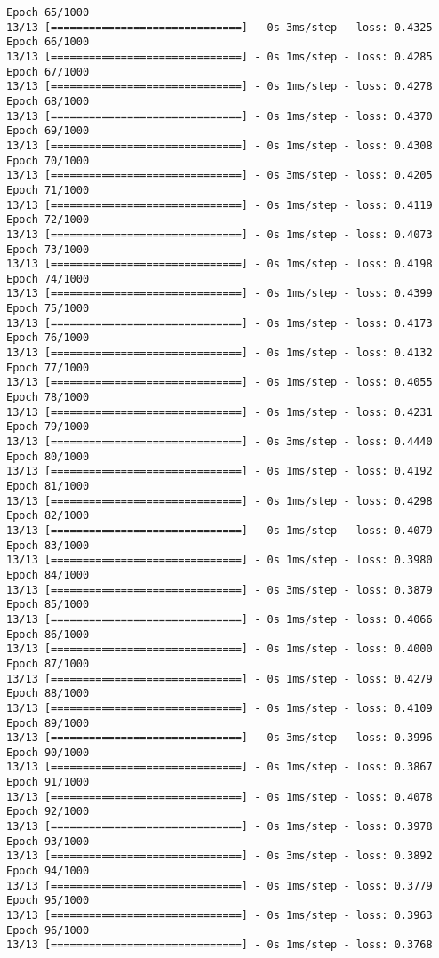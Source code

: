 \documentclass[11pt]{article}
\begin{document}
\begin{Verbatim}[commandchars=\\\{\}]
Epoch 65/1000
13/13 [==============================] - 0s 3ms/step - loss: 0.4325
Epoch 66/1000
13/13 [==============================] - 0s 1ms/step - loss: 0.4285
Epoch 67/1000
13/13 [==============================] - 0s 1ms/step - loss: 0.4278
Epoch 68/1000
13/13 [==============================] - 0s 1ms/step - loss: 0.4370
Epoch 69/1000
13/13 [==============================] - 0s 1ms/step - loss: 0.4308
Epoch 70/1000
13/13 [==============================] - 0s 3ms/step - loss: 0.4205
Epoch 71/1000
13/13 [==============================] - 0s 1ms/step - loss: 0.4119
Epoch 72/1000
13/13 [==============================] - 0s 1ms/step - loss: 0.4073
Epoch 73/1000
13/13 [==============================] - 0s 1ms/step - loss: 0.4198
Epoch 74/1000
13/13 [==============================] - 0s 1ms/step - loss: 0.4399
Epoch 75/1000
13/13 [==============================] - 0s 1ms/step - loss: 0.4173
Epoch 76/1000
13/13 [==============================] - 0s 1ms/step - loss: 0.4132
Epoch 77/1000
13/13 [==============================] - 0s 1ms/step - loss: 0.4055
Epoch 78/1000
13/13 [==============================] - 0s 1ms/step - loss: 0.4231
Epoch 79/1000
13/13 [==============================] - 0s 3ms/step - loss: 0.4440
Epoch 80/1000
13/13 [==============================] - 0s 1ms/step - loss: 0.4192
Epoch 81/1000
13/13 [==============================] - 0s 1ms/step - loss: 0.4298
Epoch 82/1000
13/13 [==============================] - 0s 1ms/step - loss: 0.4079
Epoch 83/1000
13/13 [==============================] - 0s 1ms/step - loss: 0.3980
Epoch 84/1000
13/13 [==============================] - 0s 3ms/step - loss: 0.3879
Epoch 85/1000
13/13 [==============================] - 0s 1ms/step - loss: 0.4066
Epoch 86/1000
13/13 [==============================] - 0s 1ms/step - loss: 0.4000
Epoch 87/1000
13/13 [==============================] - 0s 1ms/step - loss: 0.4279
Epoch 88/1000
13/13 [==============================] - 0s 1ms/step - loss: 0.4109
Epoch 89/1000
13/13 [==============================] - 0s 3ms/step - loss: 0.3996
Epoch 90/1000
13/13 [==============================] - 0s 1ms/step - loss: 0.3867
Epoch 91/1000
13/13 [==============================] - 0s 1ms/step - loss: 0.4078
Epoch 92/1000
13/13 [==============================] - 0s 1ms/step - loss: 0.3978
Epoch 93/1000
13/13 [==============================] - 0s 3ms/step - loss: 0.3892
Epoch 94/1000
13/13 [==============================] - 0s 1ms/step - loss: 0.3779
Epoch 95/1000
13/13 [==============================] - 0s 1ms/step - loss: 0.3963
Epoch 96/1000
13/13 [==============================] - 0s 1ms/step - loss: 0.3768

\end{Verbatim}
\end{document}

